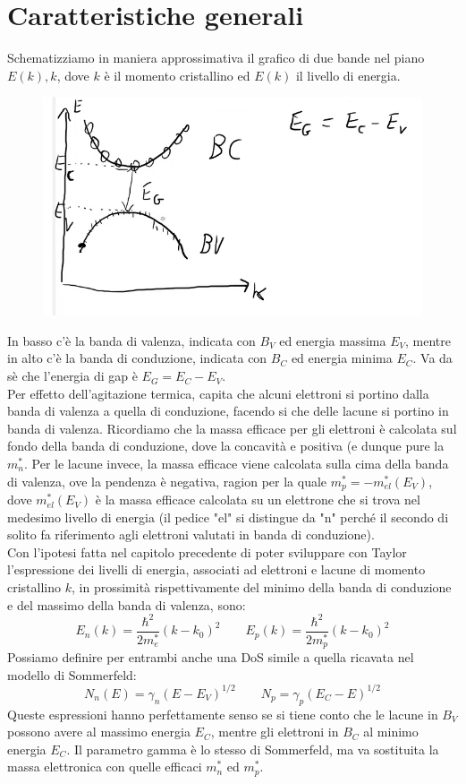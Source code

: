 \documentclass{book}
\begin{document}
    \section{Caratteristiche generali}
        Schematizziamo in maniera approssimativa il grafico di due bande nel piano $E(k), k$, dove $k$ è il momento cristallino ed $E(k)$ il livello di energia.
        \begin{figure}[h!]
            \centering
            \includegraphics[width=0.5\linewidth]{img/radio4.png}
        \end{figure}
        In basso c'è la banda di valenza, indicata con $B_{V}$ ed energia massima $E_{V}$, mentre in alto c'è la banda di conduzione, indicata con $B_{C}$ ed energia minima $E_{C}$. Va da sè che l'energia di gap è $E_{G} = E_{C} - E_{V}$.\\
        Per effetto dell'agitazione termica, capita che alcuni elettroni si portino dalla banda di valenza a quella di conduzione, facendo si che delle lacune si portino in banda di valenza. Ricordiamo che la massa efficace per gli elettroni è calcolata sul fondo della banda di conduzione, dove la concavità e positiva (e dunque pure la $m^{*}_{n}$. Per le lacune invece, la massa efficace viene calcolata sulla cima della banda di valenza, ove la pendenza è negativa, ragion per la quale $m^{*}_{p} = - m_{el}^{*}(E_{V})$, dove $m_{el}^{*}(E_{V})$ è la massa efficace calcolata su un elettrone che si trova nel medesimo livello di energia (il pedice "el" si distingue da "n" perché il secondo di solito fa riferimento agli elettroni valutati in banda di conduzione).\\
        Con l'ipotesi fatta nel capitolo precedente di poter sviluppare con Taylor l'espressione dei livelli di energia, associati ad elettroni e lacune di momento cristallino $k$, in prossimità rispettivamente del minimo della banda di conduzione e del massimo della banda di valenza, sono:
        $$E_{n}(k) = \frac{\hbar ^{2}}{2m_{e} ^{*}}(k-k_{0})^{2} \qquad E_{p}(k) = \frac{\hbar ^{2}}{2m_{p} ^{*}}(k-k_{0})^{2}$$
        Possiamo definire per entrambi anche una DoS simile a quella ricavata nel modello di Sommerfeld:
        $$N_{n}(E) = \gamma_{n}(E-E_{V})^{1/2} \qquad N_{p} = \gamma_{p}(E_{C}-E)^{1/2}$$
        Queste espressioni hanno perfettamente senso se si tiene conto che le lacune in $B_{V}$ possono avere al massimo energia $E_{C}$, mentre gli elettroni in $B_{C}$ al minimo energia $E_{C}$.
        Il parametro gamma è lo stesso di Sommerfeld, ma va sostituita la massa elettronica con quelle efficaci $m_{n} ^{*}$ ed $m_{p} ^{*}$.
\end{document}

